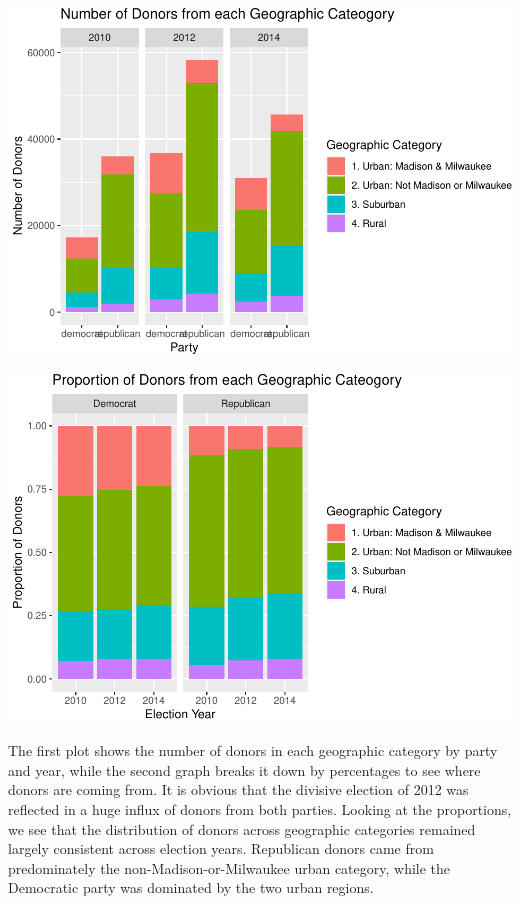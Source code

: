 \documentclass[10pt,]{article}
\begin{document}
\includegraphics{scratch_files/figure-latex/unnamed-chunk-16-1.pdf}

\includegraphics{scratch_files/figure-latex/unnamed-chunk-17-1.pdf}

The first plot shows the number of donors in each geographic category by
party and year, while the second graph breaks it down by percentages to
see where donors are coming from. It is obvious that the divisive
election of 2012 was reflected in a huge influx of donors from both
parties. Looking at the proportions, we see that the distribution of
donors across geographic categories remained largely consistent across
election years. Republican donors came from predominately the
non-Madison-or-Milwaukee urban category, while the Democratic party was
dominated by the two urban regions.

\newpage
\end{document}
